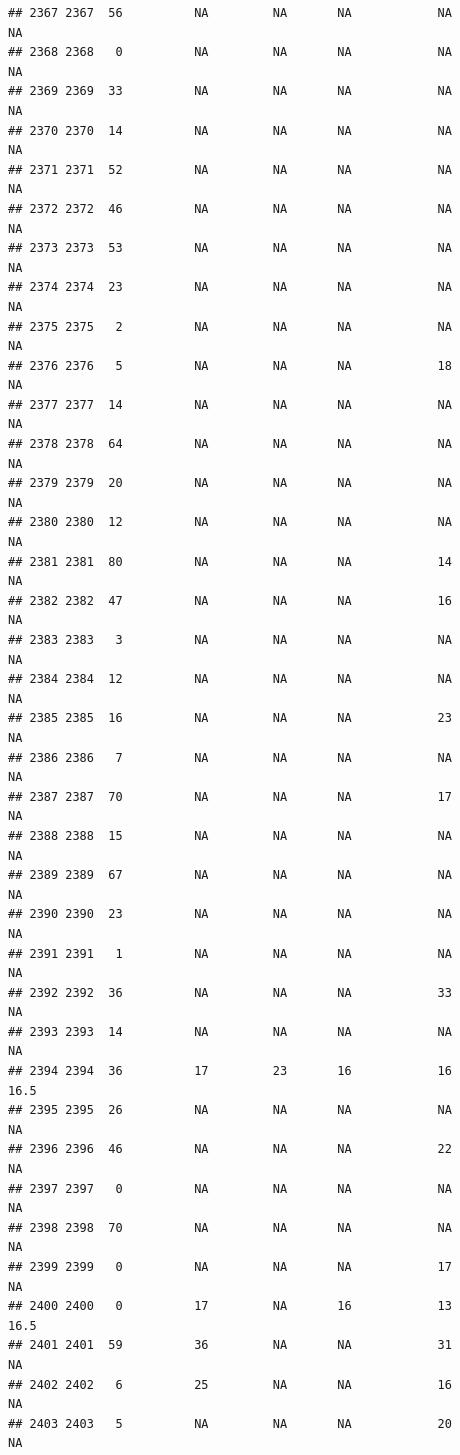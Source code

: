 \documentclass[man]{apa6}
\begin{document}
\begin{verbatim}
## 2367 2367  56          NA         NA       NA            NA       NA
## 2368 2368   0          NA         NA       NA            NA       NA
## 2369 2369  33          NA         NA       NA            NA       NA
## 2370 2370  14          NA         NA       NA            NA       NA
## 2371 2371  52          NA         NA       NA            NA       NA
## 2372 2372  46          NA         NA       NA            NA       NA
## 2373 2373  53          NA         NA       NA            NA       NA
## 2374 2374  23          NA         NA       NA            NA       NA
## 2375 2375   2          NA         NA       NA            NA       NA
## 2376 2376   5          NA         NA       NA            18       NA
## 2377 2377  14          NA         NA       NA            NA       NA
## 2378 2378  64          NA         NA       NA            NA       NA
## 2379 2379  20          NA         NA       NA            NA       NA
## 2380 2380  12          NA         NA       NA            NA       NA
## 2381 2381  80          NA         NA       NA            14       NA
## 2382 2382  47          NA         NA       NA            16       NA
## 2383 2383   3          NA         NA       NA            NA       NA
## 2384 2384  12          NA         NA       NA            NA       NA
## 2385 2385  16          NA         NA       NA            23       NA
## 2386 2386   7          NA         NA       NA            NA       NA
## 2387 2387  70          NA         NA       NA            17       NA
## 2388 2388  15          NA         NA       NA            NA       NA
## 2389 2389  67          NA         NA       NA            NA       NA
## 2390 2390  23          NA         NA       NA            NA       NA
## 2391 2391   1          NA         NA       NA            NA       NA
## 2392 2392  36          NA         NA       NA            33       NA
## 2393 2393  14          NA         NA       NA            NA       NA
## 2394 2394  36          17         23       16            16     16.5
## 2395 2395  26          NA         NA       NA            NA       NA
## 2396 2396  46          NA         NA       NA            22       NA
## 2397 2397   0          NA         NA       NA            NA       NA
## 2398 2398  70          NA         NA       NA            NA       NA
## 2399 2399   0          NA         NA       NA            17       NA
## 2400 2400   0          17         NA       16            13     16.5
## 2401 2401  59          36         NA       NA            31       NA
## 2402 2402   6          25         NA       NA            16       NA
## 2403 2403   5          NA         NA       NA            20       NA

\end{verbatim}
\end{document}
